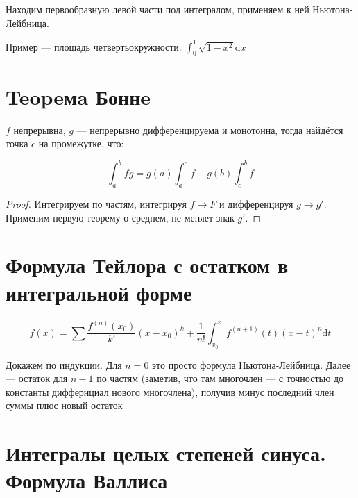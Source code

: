 \documentclass[12pt, a4paper]{article}
\begin{document}
    Находим первообразную левой части под интегралом, применяем к ней Ньютона-Лейбница.

    Пример — площадь четвертьокружности: $\int^1_0 \sqrt{1 - x^2} \mathrm{d}x$

\section{Teopeмa Боннe}

    \begin{theorem}
        
        $f$ непрерывна, $g$ — непрерывно дифференцируема и монотонна, тогда найдётся точка $c$ на промежутке, что:

        \begin{equation}
            \int^b_a fg = g(a)\int^c_a f + g(b)\int^b_c f
        \end{equation}

        \begin{proof}
            Интегрируем по частям, интегрируя $f → F$ и дифференцируя $g → g'$.
            Применим первую теорему о среднем, не меняет знак $g'$.
        \end{proof}
    \end{theorem}

\section{Формула Тейлора с остатком в интегральной форме}

    \begin{equation}
        f(x) = \sum \frac{f^{(n)}(x_0)}{k!}(x - x_0)^k + \frac{1}{n!} \int^x_{x_0} f^{(n + 1)}(t) (x - t)^n \mathrm{d}t
    \end{equation}

    Докажем по индукции. Для $n = 0$ это просто формула Ньютона-Лейбница. 
    Далее — остаток для $n - 1$ по частям (заметив, что там многочлен — с точностью до константы диффернциал нового многочлена), получив минус последний член суммы плюс новый остаток

\section{Интегралы целых степеней синуса. Формула Валлиса}
\end{document}

